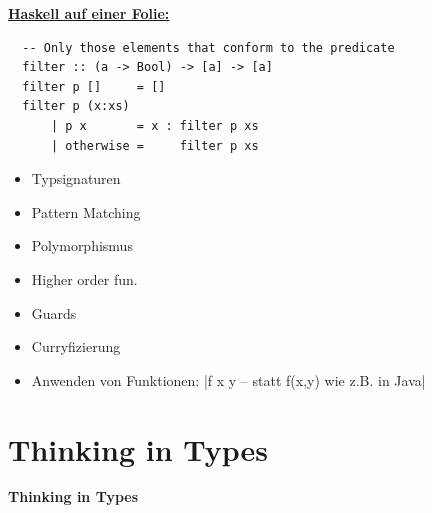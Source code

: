 \documentclass[unknownkeysallowed]{beamer}
\begin{document}
  \begin{frame}[fragile]
  
  \Large\textbf{\underline{Haskell auf einer Folie:}} \bigskip \normalsize

  \begin{verbatim}
  -- Only those elements that conform to the predicate
  filter :: (a -> Bool) -> [a] -> [a]
  filter p []     = []
  filter p (x:xs) 
      | p x       = x : filter p xs
      | otherwise =     filter p xs
  \end{verbatim}
  
  \pause
  
  \begin{multicols}{2}
  \begin{itemize}
  \item Typsignaturen    \pause
  \item Pattern Matching \pause
  \item Polymorphismus   \pause
  \end{itemize}
  
  \columnbreak
  
  \begin{itemize}
  \item Higher order fun. \pause
  \item Guards            \pause
  \item Curryfizierung    \pause
  \end{itemize}

  \end{multicols}

  \begin{itemize}
  \item Anwenden von Funktionen: |f x y -- statt f(x,y) wie z.B. in Java| 
  \end{itemize}
  
\end{frame}

\section{Thinking in Types}
\begin{frame}

    \begin{center}
    \Large\textbf{Thinking in Types}
    \end{center}

\end{frame}
\end{document}
